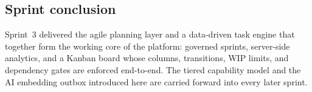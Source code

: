 
\subsection{Sprint conclusion}

Sprint~3 delivered the agile planning layer and a data-driven task engine that together form the
working core of the platform: governed sprints, server-side analytics, and a Kanban board whose
columns, transitions, WIP limits, and dependency gates are enforced end-to-end. The tiered
capability model and the AI embedding outbox introduced here are carried forward into every
later sprint.

\fi %
